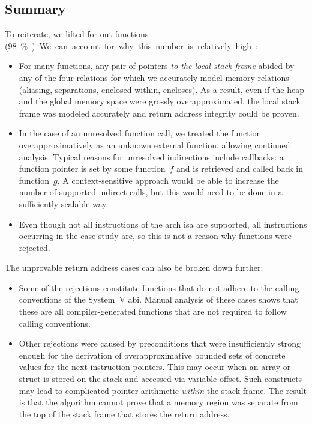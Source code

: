 \subsection{Summary}\label{hg-results-summary}
To reiterate, we lifted  for  out  functions (\SI{98}\percent).
We can account for why this number is relatively high:
\begin{itemize}
  \item For many functions, any pair of pointers \emph{to the local stack frame} abided by any of the four relations for which we accurately model memory relations (aliasing, separations, enclosed within, encloses).
  As a result, even if the heap and the global memory space were grossly overapproximated, the local stack frame was modeled accurately and return address integrity could be proven.
  \item In the case of an unresolved function call, we treated the function overapproximatively as an unknown external function, allowing continued analysis.
  Typical reasons for unresolved indirections include callbacks: a function pointer is set by some function~$f$ and is retrieved and called back in function~$g$. A context-sensitive approach would be able to increase the number of supported indirect calls, but this would need to be done in a sufficiently scalable way.
  \item Even though not all instructions of the \gls{arch} \ac{isa} are supported, all instructions occurring in the case study are, so this is not a reason why functions were rejected.
\end{itemize}
The unprovable return address cases can also be broken down further:
\begin{itemize}
  \item Some of the rejections constitute functions that do not adhere to the calling conventions of the System~V \ac{abi}.
  Manual analysis of these cases shows that these are all compiler-generated functions that are not required to follow calling conventions.
  \item Other rejections were caused by preconditions that were insufficiently strong enough for the derivation of overapproximative bounded sets of concrete values for the next instruction pointers.
  This may occur when an array or struct is stored on the stack and accessed via variable offset.
  Such constructs may lead to complicated pointer arithmetic \emph{within} the stack frame.
  The result is that the algorithm cannot prove that a memory region was separate from the top of the stack frame that stores the return address.
\end{itemize}

